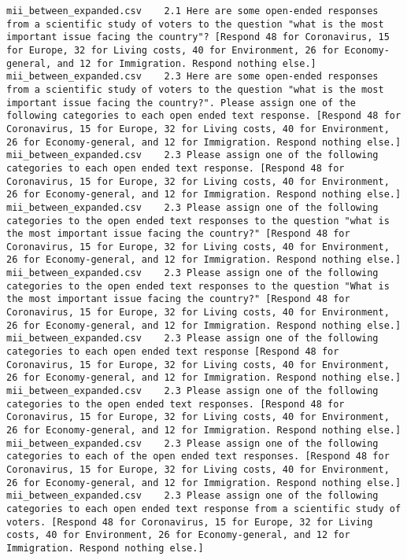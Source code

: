 \begin{lstlisting}[label=lst:promptvariants]
mii_between_expanded.csv	2.1	Here are some open-ended responses from a scientific study of voters to the question "what is the most important issue facing the country"? [Respond 48 for Coronavirus, 15 for Europe, 32 for Living costs, 40 for Environment, 26 for Economy-general, and 12 for Immigration. Respond nothing else.]
mii_between_expanded.csv	2.3	Here are some open-ended responses from a scientific study of voters to the question "what is the most important issue facing the country?". Please assign one of the following categories to each open ended text response. [Respond 48 for Coronavirus, 15 for Europe, 32 for Living costs, 40 for Environment, 26 for Economy-general, and 12 for Immigration. Respond nothing else.]
mii_between_expanded.csv	2.3	Please assign one of the following categories to each open ended text response. [Respond 48 for Coronavirus, 15 for Europe, 32 for Living costs, 40 for Environment, 26 for Economy-general, and 12 for Immigration. Respond nothing else.]
mii_between_expanded.csv	2.3	Please assign one of the following categories to the open ended text responses to the question "what is the most important issue facing the country?" [Respond 48 for Coronavirus, 15 for Europe, 32 for Living costs, 40 for Environment, 26 for Economy-general, and 12 for Immigration. Respond nothing else.]
mii_between_expanded.csv	2.3	Please assign one of the following categories to the open ended text responses to the question "What is the most important issue facing the country?" [Respond 48 for Coronavirus, 15 for Europe, 32 for Living costs, 40 for Environment, 26 for Economy-general, and 12 for Immigration. Respond nothing else.]
mii_between_expanded.csv	2.3	Please assign one of the following categories to each open ended text response [Respond 48 for Coronavirus, 15 for Europe, 32 for Living costs, 40 for Environment, 26 for Economy-general, and 12 for Immigration. Respond nothing else.]
mii_between_expanded.csv	2.3	Please assign one of the following categories to the open ended text responses. [Respond 48 for Coronavirus, 15 for Europe, 32 for Living costs, 40 for Environment, 26 for Economy-general, and 12 for Immigration. Respond nothing else.]
mii_between_expanded.csv	2.3	Please assign one of the following categories to each of the open ended text responses. [Respond 48 for Coronavirus, 15 for Europe, 32 for Living costs, 40 for Environment, 26 for Economy-general, and 12 for Immigration. Respond nothing else.]
mii_between_expanded.csv	2.3	Please assign one of the following categories to each open ended text response from a scientific study of voters. [Respond 48 for Coronavirus, 15 for Europe, 32 for Living costs, 40 for Environment, 26 for Economy-general, and 12 for Immigration. Respond nothing else.]

\end{lstlisting}
